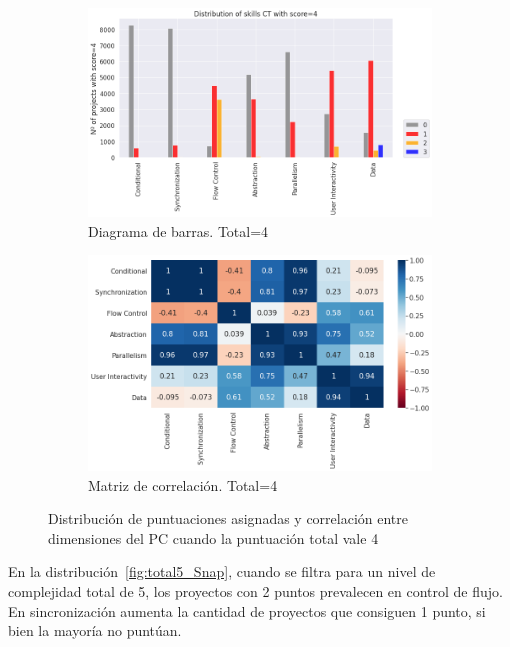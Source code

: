 \documentclass[a4paper, 12pt]{book}
\begin{document}
\begin{figure}[H]
    \centering
    \begin{subfigure}[h]{.49\textwidth} 
        \includegraphics[width=\textwidth]{img/distribucion_4_Snap}
        \caption{Diagrama de barras. Total=4}
        \label{fig:total4_Snap}
    \end{subfigure}       
    \begin{subfigure}[h]{.49\textwidth} 
        \includegraphics[width=\textwidth]{img/corr_4_Snap}
        \caption{Matriz de correlación. Total=4}
        \label{fig:corr4_Snap}
    \end{subfigure}
     \caption{Distribución de puntuaciones asignadas y correlación entre dimensiones del PC cuando la puntuación total vale 4}
\end{figure}

En la distribución~\ref{fig:total5_Snap}, cuando se filtra para un nivel de complejidad total de 5, los proyectos con 2 puntos prevalecen en control de flujo. En sincronización aumenta la cantidad de proyectos que consiguen 1 punto, si bien la mayoría no puntúan.
\end{document}

